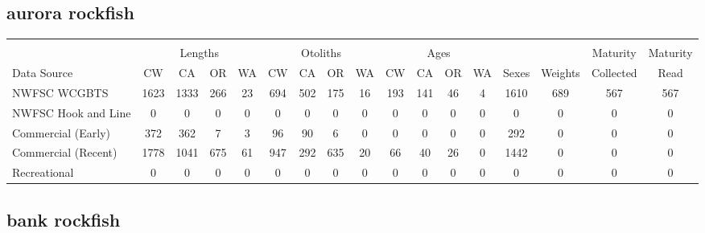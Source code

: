 \documentclass[12pt,]{article}
\begin{document}
\FloatBarrier  

\subsection{aurora rockfish}\label{aurora-rockfish}

\begin{table}[ht]
\centering
\begingroup\fontsize{10pt}{10pt}\selectfont
\begin{tabular}{|l|cccc|cccc|cccc|c|c|c|c|}
  \hline
 &  &  &  &  &  &  &  &  &  &  &  &  &  &  &  &  \\ 
   & \multicolumn{4}{c}{Lengths} &  \multicolumn{4}{c}{Otoliths} & \multicolumn{4}{c}{Ages} &  & & Maturity & Maturity\\
 Data Source & CW & CA & OR & WA & CW & CA & OR & WA & CW & CA & OR & WA & Sexes & Weights & Collected & Read\\
 \hline
NWFSC WCGBTS & 1623 & 1333 & 266 & 23 & 694 & 502 & 175 & 16 & 193 & 141 & 46 & 4 & 1610 & 689 & 567 & 567 \\ 
  NWFSC Hook and Line & 0 & 0 & 0 & 0 & 0 & 0 & 0 & 0 & 0 & 0 & 0 & 0 & 0 & 0 & 0 & 0 \\ 
  Commercial (Early) & 372 & 362 & 7 & 3 & 96 & 90 & 6 & 0 & 0 & 0 & 0 & 0 & 292 & 0 & 0 & 0 \\ 
  Commercial (Recent) & 1778 & 1041 & 675 & 61 & 947 & 292 & 635 & 20 & 66 & 40 & 26 & 0 & 1442 & 0 & 0 & 0 \\ 
  Recreational & 0 & 0 & 0 & 0 & 0 & 0 & 0 & 0 & 0 & 0 & 0 & 0 & 0 & 0 & 0 & 0 \\ 
   \hline
\end{tabular}
\endgroup
\end{table}

\FloatBarrier  

\subsection{bank rockfish}\label{bank-rockfish}
\end{document}
